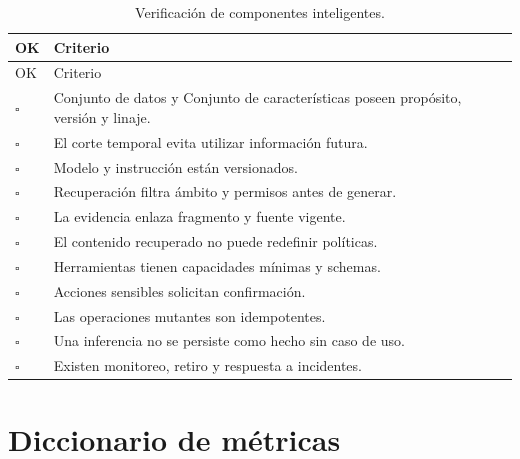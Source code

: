 \begin{longtable}{p{1cm}p{12.8cm}}
\caption{Verificación de componentes inteligentes.}\label{tab:check-ia}\\
\toprule
OK & Criterio \\
\midrule
\endfirsthead
\toprule
OK & Criterio \\
\midrule
\endhead
$\square$ & Conjunto de datos y Conjunto de características poseen propósito, versión y linaje.\\
$\square$ & El corte temporal evita utilizar información futura.\\
$\square$ & Modelo y instrucción están versionados.\\
$\square$ & Recuperación filtra ámbito y permisos antes de generar.\\
$\square$ & La evidencia enlaza fragmento y fuente vigente.\\
$\square$ & El contenido recuperado no puede redefinir políticas.\\
$\square$ & Herramientas tienen capacidades mínimas y schemas.\\
$\square$ & Acciones sensibles solicitan confirmación.\\
$\square$ & Las operaciones mutantes son idempotentes.\\
$\square$ & Una inferencia no se persiste como hecho sin caso de uso.\\
$\square$ & Existen monitoreo, retiro y respuesta a incidentes.\\
\bottomrule
\end{longtable}

\chapter{Diccionario de métricas}


